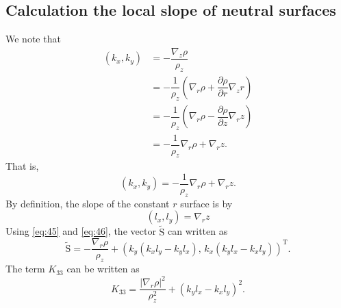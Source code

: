 \documentclass[12pt]{report}
\def\p{\partial}
\def\tilde{\widetilde}
\def\bs{\boldsymbol}
\def\Sb{\bs{\mathrm{S}}}
\begin{document}
\subsection{Calculation the local slope of neutral surfaces}
We note that 
\begin{align*}
  (k_x, k_y) &= -\dfrac{\nabla_z\rho}{\rho_z}\\
                &= -\dfrac{1}{\rho_z}\left(\nabla_r\rho +
                  \dfrac{\p\rho}{\p r}\nabla_z r\right)\\
                &= -\dfrac{1}{\rho_z}\left(\nabla_r\rho -
                  \dfrac{\p\rho}{\p z}\nabla_r z\right)\\
                &= -\dfrac{1}{\rho_z}\nabla_r\rho + \nabla_r z.
\end{align*}
That is,
\begin{equation}
  \label{eq:45}
(k_x,k_y) = -\dfrac{1}{\rho_z}\nabla_r\rho + \nabla_r z.
\end{equation}
By definition, the slope of the constant $r$ surface is by
\begin{equation}
  \label{eq:46}
  (l_x, l_y) = \nabla_r z
\end{equation}
Using \eqref{eq:45} and \eqref{eq:46}, the vector $\tilde{\Sb}$ can
written as 
\begin{equation}
  \label{eq:47}
  \tilde{\Sb} = -\dfrac{\nabla_r\rho}{\rho_z} +
  \left( k_y(k_xl_y - k_yl_x),\, k_x(k_yl_x - k_xl_y)\right)^\textrm{T}. 
\end{equation}
The term $K_{33}$ can be written as
\begin{equation}
  \label{eq:49}
   K_{33} = \dfrac{|\nabla_r\rho|^2}{\rho_z^2}+ (k_yl_x - k_xl_y)^2.
\end{equation}
\end{document}
